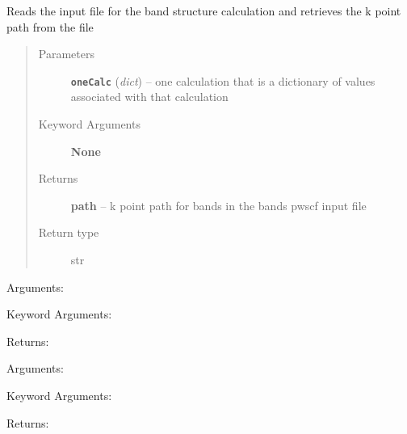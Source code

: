 \documentclass[letterpaper,10pt,english]{sphinxmanual}
\begin{document}
\begin{fulllineitems}
\label{retr:retr.__getPathFromFile}
Reads the input file for the band structure calculation and retrieves the
k point path from the file
\begin{quote}\begin{description}
\item[{Parameters}] \leavevmode
\textbf{\texttt{oneCalc}} (\emph{dict}) -- one calculation that is a dictionary of values associated with that calculation

\item[{Keyword Arguments}] \leavevmode
\textbf{None}

\item[{Returns}] \leavevmode
\textbf{path} --
k point path for bands in the bands pwscf input file

\item[{Return type}] \leavevmode
str

\end{description}\end{quote}

\end{fulllineitems}


\begin{fulllineitems}
\label{retr:retr.__getPosLabels}
Arguments:

Keyword Arguments:

Returns:

\end{fulllineitems}


\begin{fulllineitems}
\label{retr:retr.__getPositions}
Arguments:

Keyword Arguments:

Returns:

\end{fulllineitems}

\end{document}

